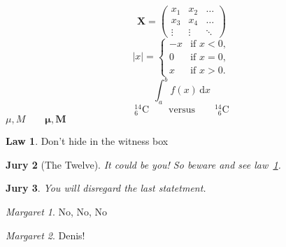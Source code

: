 \documentclass{article}
\newcommand{\ud}{\,\mathrm{d}}
\theoremstyle{definition} \newtheorem{law}{Law}
\theoremstyle{plain}      \newtheorem{jury}[law]{Jury}
\theoremstyle{remark}     \newtheorem*{marg}{Margaret}
\begin{document}
\begin{equation*}
 \mathbf{X} = \left(
   \begin{array}{ccc}
     x_1 & x_2 & \ldots \\
     x_3 & x_4 & \ldots \\
     \vdots & \vdots & \ddots
   \end{array} \right)
\end{equation*}
\begin{equation*}
  |x| = \left\{
    \begin{array}{rl}
     -x & \text{if } x < 0, \\
     0 &  \text{if } x = 0, \\
     x &  \text{if } x > 0.
    \end{array} \right.
\end{equation*}
\begin{equation*}
 \int_a^b f(x)\ud x
\end{equation*}
\begin{equation*}
{}^{14}_{6}\text{C}
\qquad \text{versus} \qquad
{}^{14}_{\phantom{1}6}\text{C}
\end{equation*}
$\mu, M \qquad \boldsymbol{\mu}, \boldsymbol{M}$
\begin{law} \label{law:box}
Don't hide in the witness box
\end{law}
\begin{jury}[The Twelve]
It could be you! So beware and see law~\ref{law:box}.
\end{jury}
\begin{jury}
You will disregard the last statetment. 
\end{jury}
\begin{marg}No, No, No\end{marg}
\begin{marg}Denis!\end{marg}
\end{document}
